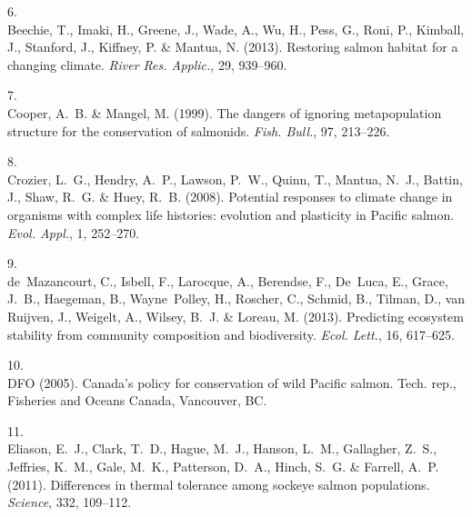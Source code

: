 \documentclass[11pt]{article}
\begin{document}
\begin{spacing}{1.6}
\begin{thebibliography}{50}
6.\\
Beechie, T., Imaki, H., Greene, J., Wade, A., Wu, H., Pess, G., Roni, P.,
  Kimball, J., Stanford, J., Kiffney, P. \& Mantua, N. (2013).
\newblock Restoring salmon habitat for a changing climate.
\newblock \emph{River Res. Applic.}, 29, 939--960.

7.\\
Cooper, A.~B. \& Mangel, M. (1999).
\newblock The dangers of ignoring metapopulation structure for the conservation
  of salmonids.
\newblock \emph{Fish. Bull.}, 97, 213--226.

8.\\
Crozier, L.~G., Hendry, A.~P., Lawson, P.~W., Quinn, T., Mantua, N.~J., Battin,
  J., Shaw, R.~G. \& Huey, R.~B. (2008).
\newblock Potential responses to climate change in organisms with complex life
  histories: evolution and plasticity in {Pacific} salmon.
\newblock \emph{Evol. Appl.}, 1, 252--270.

9.\\
de~Mazancourt, C., Isbell, F., Larocque, A., Berendse, F., De~Luca, E., Grace,
  J.~B., Haegeman, B., Wayne~Polley, H., Roscher, C., Schmid, B., Tilman, D.,
  van Ruijven, J., Weigelt, A., Wilsey, B.~J. \& Loreau, M. (2013).
\newblock Predicting ecosystem stability from community composition and
  biodiversity.
\newblock \emph{Ecol. Lett.}, 16, 617--625.

10.\\
DFO (2005).
\newblock Canada's policy for conservation of wild {Pacific} salmon.
\newblock Tech. rep., Fisheries and Oceans Canada, Vancouver, BC.

11.\\
Eliason, E.~J., Clark, T.~D., Hague, M.~J., Hanson, L.~M., Gallagher, Z.~S.,
  Jeffries, K.~M., Gale, M.~K., Patterson, D.~A., Hinch, S.~G. \& Farrell,
  A.~P. (2011).
\newblock Differences in thermal tolerance among sockeye salmon populations.
\newblock \emph{Science}, 332, 109--112.


\end{thebibliography}
\end{spacing}
\end{document}

